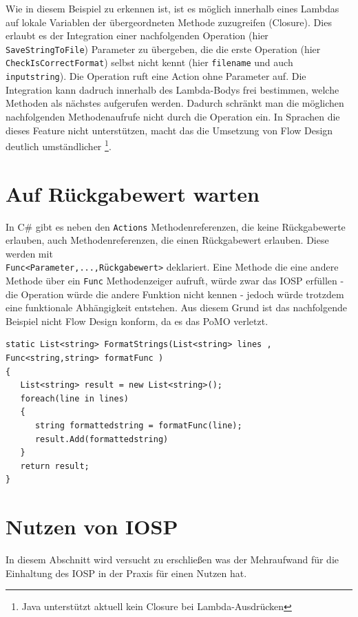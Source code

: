 Wie in diesem Beispiel zu erkennen ist, ist es möglich innerhalb eines
Lambdas auf lokale Variablen der übergeordneten Methode zuzugreifen (Closure). Dies erlaubt es der Integration einer nachfolgenden Operation (hier \texttt{SaveStringToFile}) Parameter zu übergeben,
die die erste Operation (hier \texttt{CheckIsCorrectFormat}) selbst nicht kennt (hier
\texttt{filename} und auch \texttt{inputstring}). Die Operation ruft eine Action ohne
Parameter auf. Die Integration kann dadruch innerhalb des Lambda-Bodys frei
bestimmen, welche Methoden als nächstes aufgerufen werden.
Dadurch schränkt man die möglichen nachfolgenden Methodenaufrufe nicht durch
die Operation ein. In Sprachen die dieses Feature
nicht unterstützen, macht das die Umsetzung von Flow Design deutlich umständlicher
\footnote{Java unterstützt aktuell kein Closure bei Lambda-Ausdrücken}.

\section{Auf Rückgabewert warten}

In C\# gibt es neben den \texttt{Actions} Methodenreferenzen, die keine Rückgabewerte 
erlauben, auch Methodenreferenzen, die einen Rückgabewert erlauben.
Diese werden mit\\\texttt{Func<Parameter,...,Rückgabewert>} deklariert.
Eine Methode die eine andere Methode über ein \texttt{Func} Methodenzeiger aufruft,
würde zwar das IOSP erfüllen - die Operation würde die andere Funktion nicht
kennen - jedoch würde trotzdem eine funktionale Abhängigkeit entstehen.
Aus diesem Grund ist das nachfolgende Beispiel nicht Flow Design konform, da es das PoMO verletzt.
\\
\begin{lstlisting}[caption=Auf Rückgabewert warten]
static List<string> FormatStrings(List<string> lines , Func<string,string> formatFunc )
{
   List<string> result = new List<string>();
   foreach(line in lines)
   {
      string formattedstring = formatFunc(line);
      result.Add(formattedstring)
   }
   return result;
}
\end{lstlisting}


\section{Nutzen von IOSP}

In diesem Abschnitt wird versucht zu erschließen was der Mehraufwand für die
Einhaltung des IOSP in der Praxis für einen Nutzen hat.
